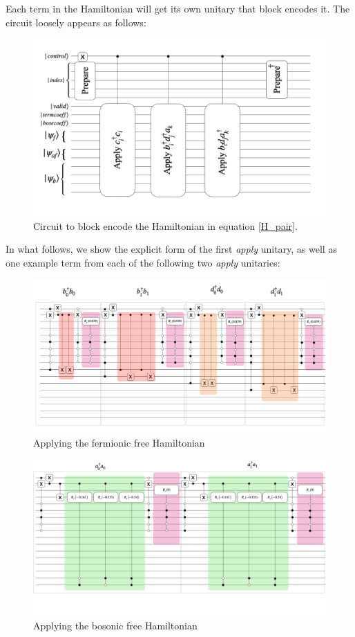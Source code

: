 Each term in the Hamiltonian will get its own unitary that block encodes it. The circuit loosely appears as follows:

\begin{figure}[h]
    \includegraphics[width = \linewidth]{figures/H_example_LOBE_circuit.png}
    \caption{Circuit to block encode the Hamiltonian in equation \ref{H_pair}. }
\end{figure}

In what follows, we show the explicit form of the first \textit{apply} unitary, as well as one example term from each of the following two \textit{apply} unitaries:

\begin{figure}[h]
    \includegraphics[width = \linewidth]{figures/fermi_free.png}
    \caption{Applying the fermionic free Hamiltonian}
\end{figure}

\begin{figure}[h]
    \includegraphics[width = \linewidth]{figures/bose_free.png}
    \caption{Applying the bosonic free Hamiltonian}
\end{figure}

